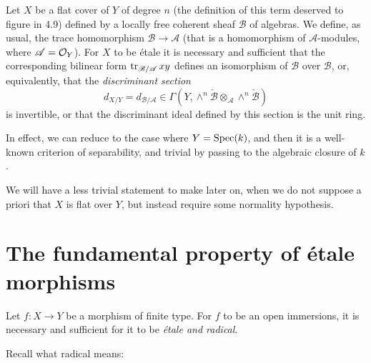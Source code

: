 \documentclass[../main.tex]{subfiles}
\begin{document}
\begin{prop}
    Let $X$ be a flat cover of $Y$ of degree $n$ (the definition of this term deserved to figure in 4.9) defined by a locally free coherent sheaf $\mathscr{B}$ of algebras.
    We define, as usual, the trace homomorphism $\mathscr{B}\to\mathscr{A}$ (that is a homomorphism of $\mathscr{A}$-modules, where $\mathscr{A}=\mathcal{O}_Y$).
    For $X$ to be étale it is necessary and sufficient that the corresponding bilinear form $\operatorname{tr}_{\mathscr{B}/\mathscr{A}}xy$ defines an isomorphism of $\mathscr{B}$ over $\mathscr{B}$, or, equivalently, that the \emph{discriminant section}
    \begin{equation*}
        d_{X/Y}=d_{\mathscr{B}/\mathscr{A}}\in\Gamma(Y,\wedge^n\check{\mathscr{B}}\otimes_\mathscr{A}\wedge^n\check{\mathscr{B}})
    \end{equation*}
    is invertible, or that the discriminant ideal defined by this section is the unit ring.
\end{prop}

In effect, we can reduce to the case where $Y=\operatorname{Spec}(k)$, and then it is a well-known criterion of separability, and trivial by passing to the algebraic closure of $k$.

\begin{rem}
    We will have a less trivial statement to make later on, when we do not suppose a priori that $X$ is flat over $Y$, but instead require some normality hypothesis.
\end{rem}


\section{The fundamental property of étale morphisms}

\begin{thm}
    Let $f\colon X\to Y$ be a morphism of finite type.
    For $f$ to be an open immersions, it is necessary and sufficient for it to be \emph{étale and radical}.
\end{thm}

Recall what radical means:
\end{document}
